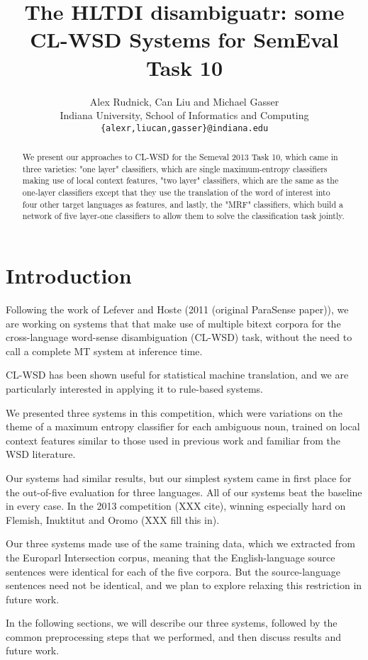 \documentclass[11pt,letterpaper]{article}
\title{The HLTDI disambiguatr: some CL-WSD Systems for SemEval Task 10}
\author{Alex Rudnick, Can Liu and Michael Gasser\\
	    Indiana University, School of Informatics and Computing \\
	    {\tt \{alexr,liucan,gasser\}@indiana.edu}}
\date{}
\begin{document}
\maketitle

\begin{abstract}
We present our approaches to CL-WSD for the Semeval 2013 Task 10, which came in
three varieties: "one layer" classifiers, which are single maximum-entropy
classifiers making use of local context features, "two layer" classifiers,
which are the same as the one-layer classifiers except that they use the
translation of the word of interest into four other target languages as
features, and lastly, the "MRF" classifiers, which build a network of five
layer-one classifiers to allow them to solve the classification task jointly.
\end{abstract}

\section{Introduction}
Following the work of Lefever and Hoste (2011 (original ParaSense paper)), we
are working on systems that that make use of multiple bitext corpora for the
cross-language word-sense disambiguation (CL-WSD) task, without the need to
call a complete MT system at inference time.

CL-WSD has been shown useful for statistical machine translation, and we are
particularly interested in applying it to rule-based systems.


We presented three systems in this competition, which were variations on the
theme of a maximum entropy classifier for each ambiguous noun, trained on local
context features similar to those used in previous work and familiar from the
WSD literature.


Our systems had similar results, but our simplest system came in first place
for the out-of-five evaluation for three languages. All of our systems beat the
baseline in every case.  In the 2013 competition (XXX cite), winning especially
hard on Flemish, Inuktitut and Oromo (XXX fill this in).


Our three systems made use of the same training data, which we extracted from
the Europarl Intersection corpus, meaning that the English-language source
sentences were identical for each of the five corpora. But the source-language
sentences need not be identical, and we plan to explore relaxing this
restriction in future work.


In the following sections, we will describe our three systems, followed by the
common preprocessing steps that we performed, and then discuss results and
future work.
\end{document}
